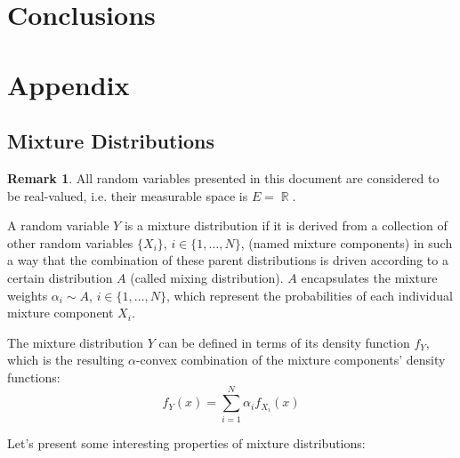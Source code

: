 \documentclass[12pt,a4paper,openright,twoside]{article}
\DeclareMathOperator*{\R}{\mathbb{R}}
\numberwithin{equation}{section}
\theoremstyle{definition}
\newtheorem*{remark}{Remark}
\theoremstyle{remark}
\theoremstyle{plain}
\begin{document}
\clearpage

\newpage

\thispagestyle{plain}
\section{Conclusions}


\newpage

\appendix
\pagestyle{fancy}
\renewcommand{\sectionmark}[1]{\markboth{#1}{}}
\renewcommand{\subsectionmark}[1]{\markright{\thesubsection.\quad #1}}

\thispagestyle{plain}
\section*{Appendix}
\sectionmark{Appendix}

\setcounter{section}{1}
\setcounter{theorem}{0}
\setcounter{definition}{0}
\setcounter{equation}{0}

\subsection{Mixture Distributions}

\begin{remark}
All random variables presented in this document are considered to be real-valued, i.e. their measurable space is $E= \R$. 
\end{remark}

A random variable $Y$ is a mixture distribution if it is derived from a collection of other random variables $\{X_i\}$, $i\in \{1, \dots, N\}$, (named mixture components) in such a way that the combination of these parent distributions is driven according to a certain distribution $A$ (called mixing distribution). $A$ encapsulates the mixture weights $\alpha_i \sim A$, $i\in \{1, \dots, N\}$, which represent the probabilities of each individual mixture component $X_i$. 

The mixture distribution $Y$ can be defined in terms of its density function $f_Y$, which is the resulting $\alpha$-convex combination of the mixture components' density functions:
\begin{equation} \label{mixtureDef}
    f_{Y} (x) = \sum_{i=1}^{N} \alpha _i f_{X_i}(x)
\end{equation}

Let's present some interesting properties of mixture distributions:
\end{document}
